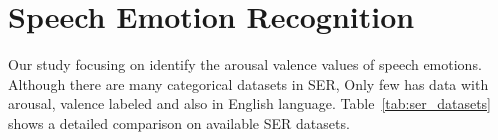 \section{Speech Emotion Recognition} 
\label{sec:ser}
\par Our study focusing on identify the arousal valence values of speech emotions. Although there are many categorical datasets in SER, Only few has data with arousal, valence labeled and also in English language. Table~\ref{tab:ser_datasets} shows a detailed comparison on available SER datasets.

 
